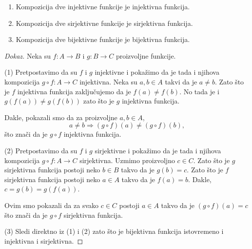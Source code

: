\begin{THM}
  \begin{enumerate}
  \item
    Kompozicija dve injektivne funkcije je injektivna funkcija.
  \item
    Kompozicija dve sirjektivne funkcije je sirjektivna funkcija.
  \item
    Kompozicija dve bijektivne funkcije je bijektivna funkcija.
  \end{enumerate}
\end{THM}
\begin{proof}[Dokaz]
  Neka su $f : A \to B$ i $g : B \to C$ proizvoljne funkcije.

  \medskip

  (1)
  Pretpostavimo da su $f$ i $g$ injektivne i poka\v zimo da je tada i njihova kompozicija $g \circ f : A \to C$ injektivna.
  Neka su $a, b \in A$ takvi da je $a \ne b$. Zato \v sto je $f$ injektivna funkcija zaklju\v cujemo da je
  $f(a) \ne f(b)$. No tada je i $g(f(a)) \ne g(f(b))$ zato \v sto je $g$ injektivna funkcija.
  \begin{center}
    
  \end{center}
  Dakle, pokazali smo
  da za proizvoljne $a, b \in A$,
  $$
    a \ne b \Rightarrow (g \circ f)(a) \ne (g \circ f)(b),
  $$
  \v sto zna\v ci da je $g \circ f$ injektivna funkcija.

  \medskip
  
  (2)
  Pretpostavimo da su $f$ i $g$ sirjektivne i poka\v zimo da je tada i njihova kompozicija $g \circ f : A \to C$ sirjektivna.
  Uzmimo proizvoljno $c \in C$. Zato \v sto je $g$ sirjektivna funkcija postoji neko $b \in B$ takvo da je $g(b) = c$.
  Zato \v sto je $f$ sirjektivna funkcija postoji neko $a \in A$ takvo da je $f(a) = b$. Dakle,
  $c = g(b) = g(f(a))$.
  \begin{center}
    
  \end{center}
  Ovim smo pokazali da za svako $c \in C$ postoji $a \in A$ takvo da je $(g \circ f)(a) = c$ \v sto
  zna\v ci da je $g \circ f$ sirjektivna funkcija.
  
  \medskip
  
  (3)
  Sledi direktno iz (1) i (2) zato \v sto je bijektivna funkcija istovremeno i injektivna i sirjektivna.
\end{proof}


